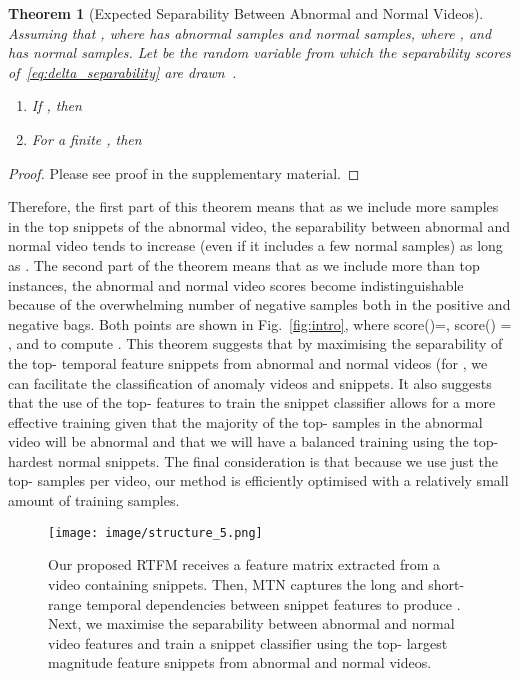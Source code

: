 \documentclass[final]{cvpr}
\newtheorem{theorem}{Theorem}[section]
\begin{document}
\begin{theorem}[Expected Separability Between Abnormal and Normal  Videos]
\label{thm:expected_separability}
Assuming that , where  has  abnormal samples and  normal samples, where , and  has  normal samples.
Let  be the random variable from which the separability scores  of~\eqref{eq:delta_separability} are drawn~\cite{li2015multiple}.
\begin{enumerate}
    \item If  , then
    
    \item For a finite , then
    
\end{enumerate}
\end{theorem}
\begin{proof}
    Please see proof in the supplementary material.
\end{proof}
Therefore, the first part of this theorem means that as we include more samples in the top  snippets of the abnormal video, 
the separability between abnormal and normal video tends to increase (even if it includes a few normal samples) as long as .  
The second part of the theorem means that as we include more than  top instances, the abnormal and normal video scores become indistinguishable because of the overwhelming number of negative samples both in the positive and negative bags.  
Both points are shown in Fig.~\ref{fig:intro}, where score()=, score() = , and  to compute . This theorem suggests that by maximising the separability of the top- temporal feature snippets from abnormal and normal videos (for , we can facilitate the classification of anomaly videos and snippets.  It also suggests that the use of the top- features to train the snippet classifier allows for a more effective training given that the majority of the top- samples in the abnormal video will be abnormal and that we will have a balanced training using the top- hardest normal snippets. The final consideration is that because we use just the top- samples per video, our method is efficiently optimised with a relatively small amount of training samples. 









\begin{figure}
\begin{center}
\texttt{[image: image/structure\_5.png]}
\end{center}
  \caption{Our proposed RTFM receives a  feature matrix  extracted from a video containing  snippets. Then, MTN captures the long and short-range temporal dependencies between snippet features to produce . Next, we maximise the separability between abnormal and normal video features and train a snippet classifier using the top- largest magnitude feature snippets from abnormal and normal videos. 
}
\label{fig:framework}
\end{figure}
\end{document}

